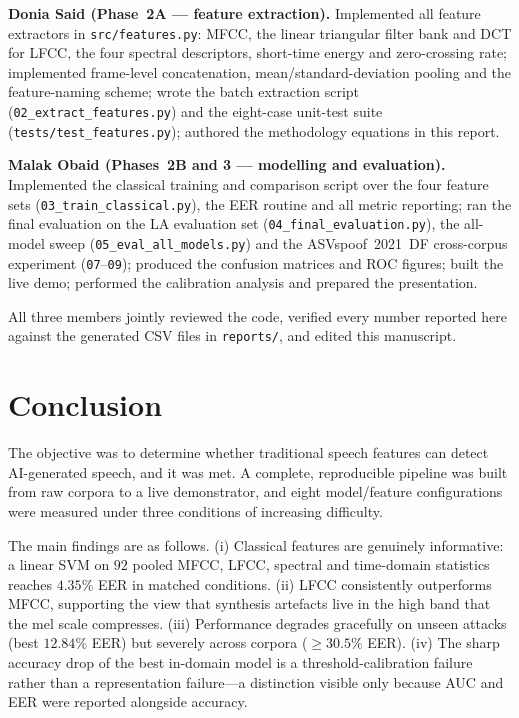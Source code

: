 \documentclass[journal,10pt]{IEEEtran}
\begin{document}
\textbf{Donia Said (Phase~2A --- feature extraction).} Implemented all
feature extractors in \texttt{src/features.py}: MFCC, the linear triangular
filter bank and DCT for LFCC, the four spectral descriptors, short-time
energy and zero-crossing rate; implemented frame-level concatenation,
mean/standard-deviation pooling and the feature-naming scheme; wrote the
batch extraction script (\texttt{02\_extract\_features.py}) and the
eight-case unit-test suite (\texttt{tests/test\_features.py}); authored the
methodology equations in this report.

\textbf{Malak Obaid (Phases~2B and 3 --- modelling and evaluation).}
Implemented the classical training and comparison script over the four
feature sets (\texttt{03\_train\_classical.py}), the EER routine and all
metric reporting; ran the final evaluation on the LA evaluation set
(\texttt{04\_final\_evaluation.py}), the all-model sweep
(\texttt{05\_eval\_all\_models.py}) and the ASVspoof~2021~DF cross-corpus
experiment (\texttt{07}--\texttt{09}); produced the confusion matrices and
ROC figures; built the live demo; performed the calibration analysis and
prepared the presentation.

All three members jointly reviewed the code, verified every number reported
here against the generated CSV files in \texttt{reports/}, and edited this
manuscript.

\section{Conclusion}
The objective was to determine whether traditional speech features can
detect AI-generated speech, and it was met. A complete, reproducible
pipeline was built from raw corpora to a live demonstrator, and eight
model/feature configurations were measured under three conditions of
increasing difficulty.

The main findings are as follows. (i) Classical features are genuinely
informative: a linear SVM on $92$ pooled MFCC, LFCC, spectral and
time-domain statistics reaches $4.35\%$ EER in matched conditions.
(ii) LFCC consistently outperforms MFCC, supporting the view that synthesis
artefacts live in the high band that the mel scale compresses.
(iii) Performance degrades gracefully on unseen attacks (best $12.84\%$ EER)
but severely across corpora ($\ge 30.5\%$ EER). (iv) The sharp accuracy drop
of the best in-domain model is a threshold-calibration failure rather than a
representation failure---a distinction visible only because AUC and EER were
reported alongside accuracy.
\end{document}
